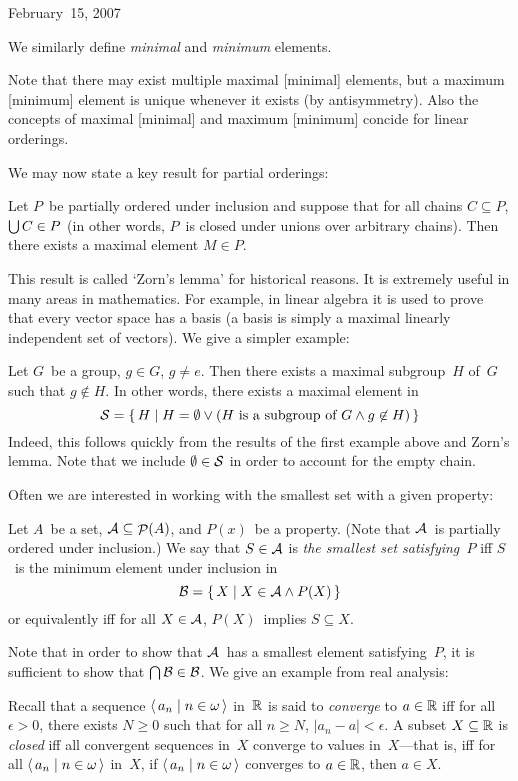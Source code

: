 \begin{lecture}{February~15, 2007}
\begin{defn}
We similarly define \emph{minimal} and \emph{minimum} elements.
\end{defn}
\noindent Note that there may exist multiple maximal [minimal] elements, but a maximum [minimum] element is unique whenever it exists (by antisymmetry). Also the concepts of maximal [minimal] and maximum [minimum] concide for linear orderings.

We may now state a key result for partial orderings:
\begin{thm}[Zorn]
Let \(P\)~be partially ordered under inclusion and suppose that for all chains \(C\subseteq P\), \(\bigcup C\in P\) (in other words, \(P\)~is closed under unions over arbitrary chains). Then there exists a maximal element \(M\in P\).
\end{thm}
\noindent This result is called `Zorn's lemma' for historical reasons. It is extremely useful in many areas in mathematics. For example, in linear algebra it is used to prove that every vector space has a basis (a basis is simply a maximal linearly independent set of vectors). We give a simpler example:
\begin{example}
Let \(G\)~be a group, \(g\in G\), \(g\ne e\). Then there exists a maximal subgroup~\(H\) of~\(G\) such that \(g\not\in H\). In other words, there exists a maximal element in
\[\mathcal{S}=\{\,H\mid H=\emptyset\lor(H\text{ is a subgroup of }G\land g\not\in H)\,\}\]
Indeed, this follows quickly from the results of the first example above and Zorn's lemma. Note that we include \(\emptyset\in\mathcal{S}\) in order to account for the empty chain.
\end{example}

Often we are interested in working with the smallest set with a given property:
\begin{defn}
Let \(A\)~be a set, \(\mathcal{A}\subseteq\mathop{\mathcal{P}}(A)\), and \(P(x)\)~be a property. (Note that \(\mathcal{A}\)~is partially ordered under inclusion.) We say that \(S\in\mathcal{A}\) is \emph{the smallest set satisfying~\(P\)} iff \(S\)~is the minimum element under inclusion in
\[\mathcal{B}=\{\,X\mid X\in\mathcal{A}\land P(X)\,\}\]
or equivalently iff for all \(X\in\mathcal{A}\), \(P(X)\)~implies \(S\subseteq X\).
\end{defn}
\noindent Note that in order to show that \(\mathcal{A}\)~has a smallest element satisfying~\(P\), it is sufficient to show that \(\bigcap\mathcal{B}\in\mathcal{B}\). We give an example from real analysis:
\begin{example}
Recall that a sequence \(\langle\,{a_n}\mid{n\in\omega}\,\rangle\) in~\(\mathbb{R}\) is said to \emph{converge} to \(a\in\mathbb{R}\) iff for all \(\epsilon>0\), there exists \(N\ge0\) such that for all \(n\ge N\), \(|a_n-a|<\epsilon\). A subset \(X\subseteq\mathbb{R}\) is \emph{closed} iff all convergent sequences in~\(X\) converge to values in~\(X\)---that is, iff for all \(\langle\,{a_n}\mid{n\in\omega}\,\rangle\) in~\(X\), if \(\langle\,{a_n}\mid{n\in\omega}\,\rangle\) converges to \(a\in\mathbb{R}\), then \(a\in X\).


\end{example}
\end{lecture}
